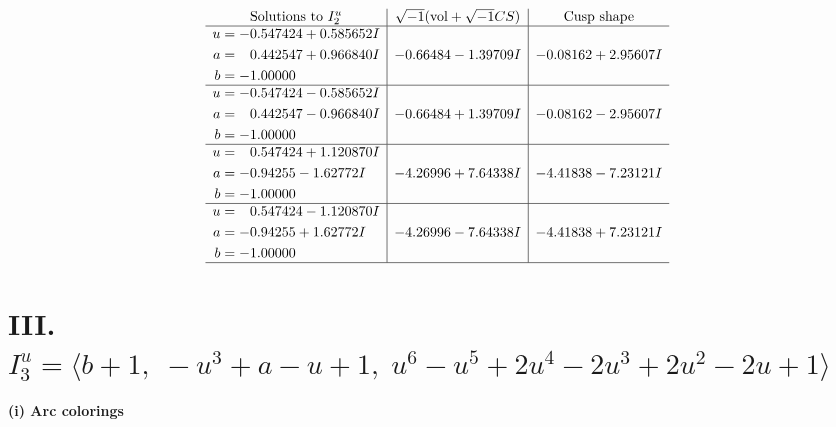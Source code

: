 \documentclass[1p]{elsarticle_modified}
\theoremstyle{definition}
\newcommand{\I}{\sqrt{-1}}
\begin{document}
$$\begin{array}{c|c|c}  
\text{Solutions to }I^u_{2}& \I (\text{vol} + \sqrt{-1}CS) & \text{Cusp shape}\\
 \hline 
\begin{aligned}
u &= -0.547424 + 0.585652 I \\
a &= \phantom{-}0.442547 + 0.966840 I \\
b &= -1.00000\phantom{ +0.000000I}\end{aligned}
 & -0.66484 - 1.39709 I & -0.08162 + 2.95607 I \\ \hline\begin{aligned}
u &= -0.547424 - 0.585652 I \\
a &= \phantom{-}0.442547 - 0.966840 I \\
b &= -1.00000\phantom{ +0.000000I}\end{aligned}
 & -0.66484 + 1.39709 I & -0.08162 - 2.95607 I \\ \hline\begin{aligned}
u &= \phantom{-}0.547424 + 1.120870 I \\
a &= -0.94255 - 1.62772 I \\
b &= -1.00000\phantom{ +0.000000I}\end{aligned}
 & -4.26996 + 7.64338 I & -4.41838 - 7.23121 I \\ \hline\begin{aligned}
u &= \phantom{-}0.547424 - 1.120870 I \\
a &= -0.94255 + 1.62772 I \\
b &= -1.00000\phantom{ +0.000000I}\end{aligned}
 & -4.26996 - 7.64338 I & -4.41838 + 7.23121 I\\
 \hline 
 \end{array}$$\newpage\newpage\renewcommand{\arraystretch}{1}
\centering \section*{III. $I^u_{3}= \langle b+1,\;- u^3+a- u+1,\;u^6- u^5+2 u^4-2 u^3+2 u^2-2 u+1 \rangle$}
\flushleft \textbf{(i) Arc colorings}\\
\end{document}
